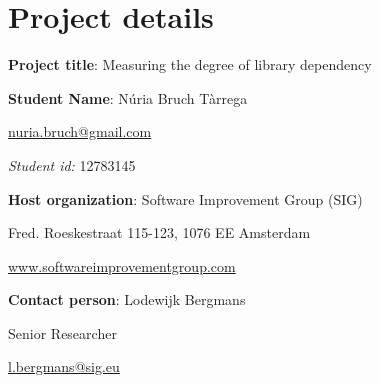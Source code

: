 \section{Project details}
\textbf{Project title}: Measuring the degree of library dependency

\bigskip\noindent
\textbf{Student Name}: Núria Bruch Tàrrega

\href{mailto:nuria.bruch@gmail.com}{nuria.bruch@gmail.com}

\textit{Student id:} 12783145

\bigskip\noindent
\textbf{Host organization}: Software Improvement Group (SIG)

Fred. Roeskestraat 115-123, 1076 EE Amsterdam

\href{https://www.softwareimprovementgroup.com/}{www.softwareimprovementgroup.com}

\bigskip\noindent
\textbf{Contact person}: Lodewijk Bergmans

Senior Researcher

\href{mailto:l.bergmans@sig.eu}{l.bergmans@sig.eu}
